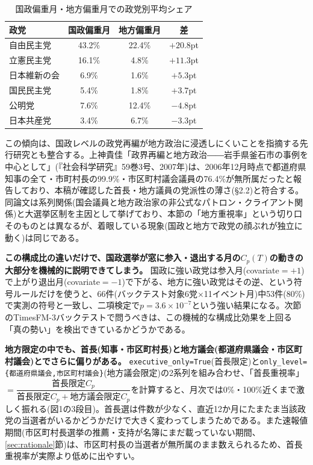 \documentclass[a4paper,11pt]{ltjsarticle}
\begin{document}
\begin{table}[h]
\centering
\small
\caption{国政偏重月・地方偏重月での政党別平均シェア}
\label{tab:national-vs-local}
\begin{tabular}{lccc}
\toprule
政党 & 国政偏重月 & 地方偏重月 & 差 \\
\midrule
自由民主党 & 43.2\% & 22.4\% & $+20.8$pt \\
立憲民主党 & 16.1\% & 4.8\% & $+11.3$pt \\
日本維新の会 & 6.9\% & 1.6\% & $+5.3$pt \\
国民民主党 & 5.4\% & 1.8\% & $+3.7$pt \\
公明党 & 7.6\% & 12.4\% & $-4.8$pt \\
日本共産党 & 3.4\% & 6.7\% & $-3.3$pt \\
\bottomrule
\end{tabular}
\end{table}

この傾向は、国政レベルの政党再編が地方政治に浸透しにくいことを指摘する先行研究とも整合する。上神貴佳「政界再編と地方政治――岩手県釜石市の事例を中心として」(『社会科学研究』59巻3号、2007年)は、2006年12月時点で都道府県知事の全て・市町村長の99.9\%・市区町村議会議員の76.4\%が無所属だったと報告しており、本稿が確認した首長・地方議員の党派性の薄さ(\S2.2)と符合する。同論文は系列関係(国会議員と地方政治家の非公式なパトロン・クライアント関係)と大選挙区制を主因として挙げており、本節の「地方重視率」という切り口そのものとは異なるが、着眼している現象(国政と地方で政党の顔ぶれが独立に動く)は同じである。

\textbf{この構成比の違いだけで、国政選挙が窓に参入・退出する月の$C_p(T)$の動きの大部分を機械的に説明できてしまう。} 国政に強い政党は参入月(covariate$=+1$)で上がり退出月(covariate$=-1$)で下がる、地方に強い政党はその逆、という符号ルールだけを使うと、66件(バックテスト対象6党×11イベント月)中53件(80\%)で実測の符号と一致し、二項検定で$p=3.6\times10^{-7}$という強い結果になる。次節のTimesFM-3バックテストで問うべきは、この機械的な構成比効果を上回る「真の勢い」を検出できているかどうかである。

\textbf{地方限定の中でも、首長(知事・市区町村長)と地方議会(都道府県議会・市区町村議会)とでさらに偏りがある。} \texttt{executive\_only=True}(首長限定)と\texttt{only\_level=\{都道府県議会,市区町村議会\}}(地方議会限定)の2系列を組み合わせ、「首長重視率」$=\dfrac{\text{首長限定}C_p}{\text{首長限定}C_p+\text{地方議会限定}C_p}$を計算すると、月次では0\%・100\%近くまで激しく振れる(図1の3段目)。首長選は件数が少なく、直近12か月にたまたま当該政党の当選者がいるかどうかだけで大きく変わってしまうためである。また速報値期間(市区町村長選挙の推薦・支持が名簿にまだ載っていない期間、\ref{sec:rationale}節)は、市区町村長の当選者が無所属のまま数えられるため、首長重視率が実際より低めに出やすい。
\end{document}

